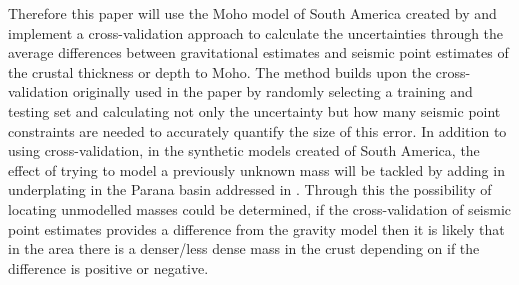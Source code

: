 Therefore this paper will use the Moho model of South America created by \cite{Uieda2016} and implement a cross-validation approach to calculate the uncertainties through the average differences between gravitational estimates and seismic point estimates of the crustal thickness or depth to Moho. The method builds upon the cross-validation originally used in the paper by randomly selecting a training and testing set and calculating not only the uncertainty but how many seismic point constraints are needed to accurately quantify the size of this error. In addition to using cross-validation, in the synthetic models created of South America, the effect of trying to model a previously unknown mass will be tackled by adding in underplating in the Parana basin addressed in \cite{Mariani2013}. Through this the possibility of locating unmodelled masses could be determined, if the cross-validation of seismic point estimates provides a difference from the gravity model then it is likely that in the area there is a denser/less dense mass in the crust depending on if the difference is positive or negative.
